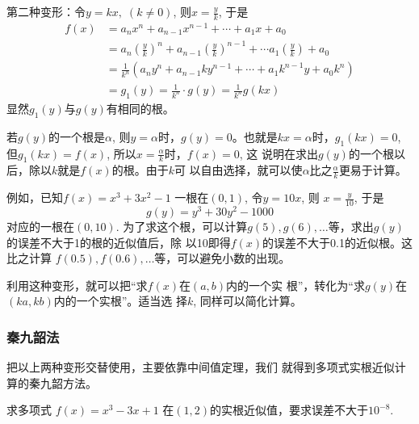 第二种变形：令$y=kx,\; (k\ne 0)$, 则$x=\frac{y}{k}$, 于是
\[\begin{split}
    f(x)&=a_nx^n+a_{n-1}x^{n-1}+\cdots+a_1x+a_0\\
    &=a_n\left(\frac{y}{k}\right)^n+a_{n-1}\left(\frac{y}{k}\right)^{n-1}+\cdots a_1\left(\frac{y}{k}\right)+a_0\\
    &=\frac{1}{k^n}\left(a_ny^n+a_{n-1}ky^{n-1}+\cdots +a_1k^{n-1}y+a_0 k^n\right)\\
    &=g_1(y)=\frac{1}{k^n}\cdot g(y)=\frac{1}{k^n}g(kx)
\end{split} \]
显然$g_1(y)$与$g(y)$有相同的根。

若$g(y)$的一个根是$\alpha$, 则$y=\alpha$时，$g(y)=0$。也就是$kx=\alpha$时，$g_1(kx)=0$, 但$g_1(kx)=f(x)$, 所以$x=\frac{\alpha}{k}$时，$f(x)=0$, 这
说明在求出$g(y)$的一个根以后，除以$k$就是$f(x)$的根。由于$k$可
以自由选择，就可以使$\alpha$比之$\frac{\alpha}{k}$更易于计算。

例如，已知$f(x)=x^3+3x^2-1$
一根在$(0,1)$, 令$y=10x$, 则
$x=\frac{y}{10}$, 于是
\[g(y)=y^3+30y^2-1000\]
对应的一根在$(0,10)$. 为了求这个根，可以计算$g(5),
g(6),\ldots$等，求出$g(y)$的误差不大于1的根的近似值后，除
以10即得$f(x)$的误差不大于0.1的近似根。这比之计算
$f(0.5),f(0.6),\ldots$等，可以避免小数的出现。

利用这种变形，就可以把“求$f(x)$在$(a,b)$内的一个实
根”，转化为“求$g(y)$在$(ka,kb)$内的一个实根”。适当选
择$k$, 同样可以简化计算。

\subsubsection{秦九韶法}

把以上两种变形交替使用，主要依靠中间值定理，我们
就得到多项式实根近似计算的秦九韶方法。

\begin{example}
    求多项式
$f(x)=x^3-3x+1$
在$(1,2)$的实根近似值，要求误差不大于$10^{-8}$.
\end{example}

